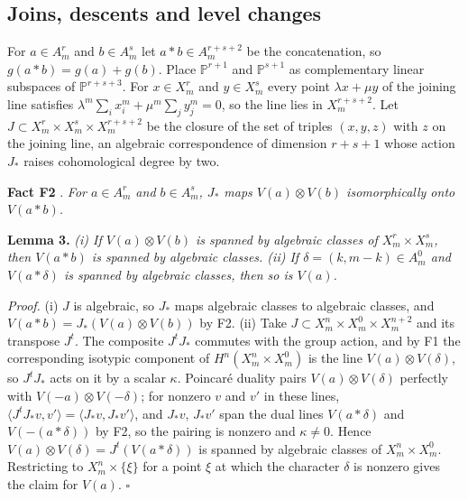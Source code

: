 \documentclass[10pt,twocolumn]{article}
\begin{document}
\hypertarget{joins-descents-and-level-changes}{%
\subsection{Joins, descents and level
changes}\label{joins-descents-and-level-changes}}

For \(a\in A^r_m\) and \(b\in A^s_m\) let \(a\ast b\in A^{r+s+2}_m\) be
the concatenation, so \(g(a\ast b)=g(a)+g(b)\). Place
\(\mathbb{P}^{r+1}\) and \(\mathbb{P}^{s+1}\) as complementary linear
subspaces of \(\mathbb{P}^{r+s+3}\). For \(x\in X^r_m\) and
\(y\in X^s_m\) every point \(\lambda x+\mu y\) of the joining line
satisfies \(\lambda^m\sum_i x_i^m+\mu^m\sum_j y_j^m=0\), so the line
lies in \(X^{r+s+2}_m\). Let
\(J\subset X^r_m\times X^s_m\times X^{r+s+2}_m\) be the closure of the
set of triples \((x,y,z)\) with \(z\) on the joining line, an algebraic
correspondence of dimension \(r+s+1\) whose action \(J_*\) raises
cohomological degree by two.

\textbf{Fact F2} \cite{sk1979,shioda1979,ran1980}. \emph{For
\(a\in A^r_m\) and \(b\in A^s_m\), \(J_*\) maps \(V(a)\otimes V(b)\)
isomorphically onto \(V(a\ast b)\).}

\textbf{Lemma 3.} \emph{(i) If \(V(a)\otimes V(b)\) is spanned by
algebraic classes of \(X^r_m\times X^s_m\), then \(V(a\ast b)\) is
spanned by algebraic classes. (ii) If \(\delta=(k,m-k)\in A^0_m\) and
\(V(a\ast\delta)\) is spanned by algebraic classes, then so is
\(V(a)\).}

\emph{Proof.} (i) \(J\) is algebraic, so \(J_*\) maps algebraic classes
to algebraic classes, and \(V(a\ast b)=J_*(V(a)\otimes V(b))\) by F2.
(ii) Take \(J\subset X^n_m\times X^0_m\times X^{n+2}_m\) and its
transpose \(J^t\). The composite \(J^tJ_*\) commutes with the group
action, and by F1 the corresponding isotypic component of
\(H^n(X^n_m\times X^0_m)\) is the line \(V(a)\otimes V(\delta)\), so
\(J^tJ_*\) acts on it by a scalar \(\kappa\). Poincaré duality pairs
\(V(a)\otimes V(\delta)\) perfectly with \(V(-a)\otimes V(-\delta)\);
for nonzero \(v\) and \(v'\) in these lines,
\(\langle J^tJ_*v,v'\rangle=\langle J_*v,J_*v'\rangle\), and \(J_*v\),
\(J_*v'\) span the dual lines \(V(a\ast\delta)\) and
\(V(-(a\ast\delta))\) by F2, so the pairing is nonzero and
\(\kappa\neq0\). Hence \(V(a)\otimes V(\delta)=J^t(V(a\ast\delta))\) is
spanned by algebraic classes of \(X^n_m\times X^0_m\). Restricting to
\(X^n_m\times\{\xi\}\) for a point \(\xi\) at which the character
\(\delta\) is nonzero gives the claim for \(V(a)\). \(\square\)
\end{document}
